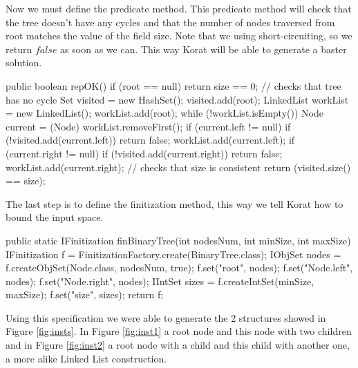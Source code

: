 \documentclass[10pt, conference, compsocconf]{IEEEtran}
\begin{document}
Now we must define the predicate method.
This predicate method will check that the tree doesn't have any cycles and that the number of nodes traversed from root matches the value of the field size.
Note that we using short-circuiting, so we return $false$ as soon as we can. This way Korat will be able to generate a baster solution.

\begin{code}
  public boolean repOK() {
    if (root == null)
      return size == 0;
    // checks that tree has no cycle
    Set visited = new HashSet();
    visited.add(root);
    LinkedList workList = new LinkedList();
    workList.add(root);
    while (!workList.isEmpty()) {
      Node current = (Node) workList.removeFirst();
      if (current.left != null) {
        if (!visited.add(current.left))
          return false;
        workList.add(current.left);
      }
      if (current.right != null) {
        if (!visited.add(current.right))
          return false;
        workList.add(current.right);
      }
    }
    // checks that size is consistent
    return (visited.size() == size);
  }
\end{code}

The last step is to define the finitization method, this way we tell Korat how to bound the input space.

\begin{code}
  public static IFinitization finBinaryTree(int nodesNum, int minSize, int maxSize) {
    IFinitization f = FinitizationFactory.create(BinaryTree.class);
    IObjSet nodes = f.createObjSet(Node.class, nodesNum, true);
    f.set("root", nodes);
    f.set("Node.left", nodes);
    f.set("Node.right", nodes);
    IIntSet sizes = f.createIntSet(minSize, maxSize);
    f.set("size", sizes);
    return f;
  }
\end{code}

Using this specification we were able to generate the 2 structures showed in Figure \ref{fig:insts}. In Figure \ref{fig:inst1} a root node and this node with two children
and in Figure \ref{fig:inst2} a root node with a child and this child with another one, a more alike Linked List construction.
\end{document}
